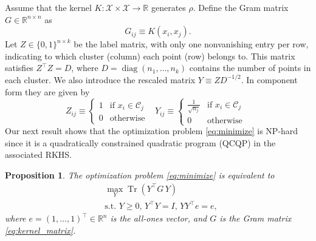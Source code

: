 \documentclass[twoside]{article}
\newtheorem{proposition}[theorem]{Proposition}
\DeclareMathOperator{\diag}{diag}
\DeclareMathOperator{\Tr}{Tr}
\newcommand\kk{K}
\newcommand\C{{\mathcal{C}}}
\newcommand\Zt{Y}
\newcommand\e{e}
\begin{document}
Assume that the kernel $\kk: \mathcal{X} \times \mathcal{X} \to \mathbb{R}$ 
generates $\rho$.  Define  the Gram matrix $G \in \mathbb{R}^{n\times n}$ as
\begin{equation}
\label{eq:kernel_matrix}
G_{ij} \equiv \kk(x_i,x_j).
\end{equation}
Let $Z \in \{ 0,1 \}^{n\times k}$ be the label matrix, 
with only one nonvanishing entry per row, 
indicating to which cluster (column)
each point (row) belongs to. This matrix satisfies
$Z^\top Z = D$, where  
$D = \diag( n_1,\dotsc, n_k )$  contains
the number of points in each cluster. We also introduce the rescaled
matrix  $Y \equiv Z D^{-1/2}$. In component form they are given by
\begin{equation}
\label{eq:label_matrix}
Z_{ij} \equiv \begin{cases}
1 & \mbox{if $x_i \in \C_j$ } \\
0 & \mbox{otherwise}
\end{cases} \
\Zt_{ij} \equiv \begin{cases}
\tfrac{1}{\sqrt{n_j}} & \mbox{if $x_i \in \C_j$ } \\
0 & \mbox{otherwise}
\end{cases}
\end{equation}
Our next result shows that the optimization problem \eqref{eq:minimize}
is NP-hard since
it is a quadratically constrained quadratic program (QCQP) in the 
associated RKHS.

\begin{proposition} 
\label{th:qcqp2}
The optimization problem \eqref{eq:minimize} is equivalent to
\begin{equation}
\label{eq:qcqp2}
\begin{split}
&\max_{\Zt} \Tr \left( \Zt^\top G \, \Zt \right) \\
&\mbox{s.t. $\Zt \ge 0$, $\Zt^\top \Zt = I$, 
$\Zt \Zt^\top \e = \e$},
\end{split}
\end{equation}
where $\e = (1,\dots,1)^\top \in \mathbb{R}^n$ is the all-ones vector,
and $G$ is the Gram matrix \eqref{eq:kernel_matrix}.
\end{proposition}
\end{document}
